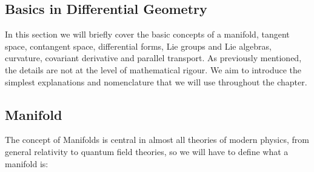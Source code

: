 \subsection{Basics in Differential
Geometry}\label{sec:Basics in differential geometry}
In this section we will briefly cover the basic concepts of a manifold, tangent space, contangent space, differential forms, Lie groups and Lie algebras, curvature, covariant derivative and parallel transport. As previously mentioned, the details are not at the level of mathematical rigour. We aim to introduce the simplest explanations and nomenclature that we will use throughout the chapter.

\subsection*{Manifold}
The concept of Manifolds is central in almost all theories of modern physics, from general relativity to quantum field theories, so we will have to define what a manifold is:

